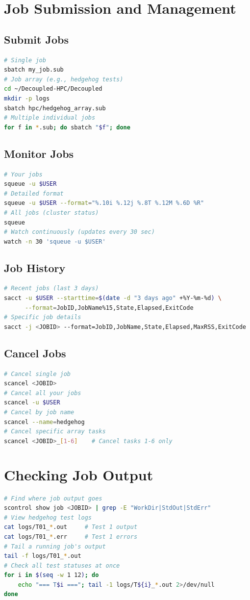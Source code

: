 \documentclass[11pt,a4paper]{article}
\begin{document}
\section{Job Submission and Management}
\subsection{Submit Jobs}
\begin{lstlisting}[language=bash]
# Single job
sbatch my_job.sub
# Job array (e.g., hedgehog tests)
cd ~/Decoupled-HPC/Decoupled
mkdir -p logs
sbatch hpc/hedgehog_array.sub
# Multiple individual jobs
for f in *.sub; do sbatch "$f"; done
\end{lstlisting}
\subsection{Monitor Jobs}
\begin{lstlisting}[language=bash]
# Your jobs
squeue -u $USER
# Detailed format
squeue -u $USER --format="%.10i %.12j %.8T %.12M %.6D %R"
# All jobs (cluster status)
squeue
# Watch continuously (updates every 30 sec)
watch -n 30 'squeue -u $USER'
\end{lstlisting}
\subsection{Job History}
\begin{lstlisting}[language=bash]
# Recent jobs (last 3 days)
sacct -u $USER --starttime=$(date -d "3 days ago" +%Y-%m-%d) \
      --format=JobID,JobName%15,State,Elapsed,ExitCode
# Specific job details
sacct -j <JOBID> --format=JobID,JobName,State,Elapsed,MaxRSS,ExitCode
\end{lstlisting}
\subsection{Cancel Jobs}
\begin{lstlisting}[language=bash]
# Cancel single job
scancel <JOBID>
# Cancel all your jobs
scancel -u $USER
# Cancel by job name
scancel --name=hedgehog
# Cancel specific array tasks
scancel <JOBID>_[1-6]    # Cancel tasks 1-6 only
\end{lstlisting}
\section{Checking Job Output}
\begin{lstlisting}[language=bash]
# Find where job output goes
scontrol show job <JOBID> | grep -E "WorkDir|StdOut|StdErr"
# View hedgehog test logs
cat logs/T01_*.out     # Test 1 output
cat logs/T01_*.err     # Test 1 errors
# Tail a running job's output
tail -f logs/T01_*.out
# Check all test statuses at once
for i in $(seq -w 1 12); do
    echo "=== T$i ==="; tail -1 logs/T${i}_*.out 2>/dev/null
done
\end{lstlisting}
\end{document}
